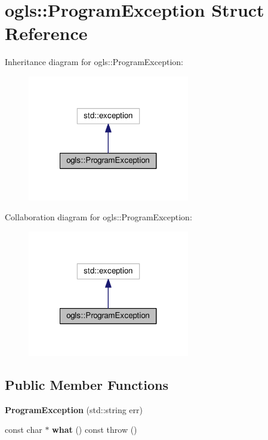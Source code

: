 \hypertarget{structogls_1_1ProgramException}{\section{ogls\-:\-:Program\-Exception Struct Reference}
\label{structogls_1_1ProgramException}
}


Inheritance diagram for ogls\-:\-:Program\-Exception\-:
\nopagebreak
\begin{figure}[H]
\begin{center}
\leavevmode
\includegraphics[width=200pt]{d2/d5f/structogls_1_1ProgramException__inherit__graph}
\end{center}
\end{figure}


Collaboration diagram for ogls\-:\-:Program\-Exception\-:
\nopagebreak
\begin{figure}[H]
\begin{center}
\leavevmode
\includegraphics[width=200pt]{d2/d29/structogls_1_1ProgramException__coll__graph}
\end{center}
\end{figure}
\subsection*{Public Member Functions}
\begin{DoxyCompactItemize}
\item 
\hypertarget{structogls_1_1ProgramException_afeaffb31d0feabdc28590e18dbdd13e2}{{\bfseries Program\-Exception} (std\-::string err)}\label{structogls_1_1ProgramException_afeaffb31d0feabdc28590e18dbdd13e2}

\item 
\hypertarget{structogls_1_1ProgramException_a82c7b3e7ba0ba7d7ff5a496741438556}{const char $\ast$ {\bfseries what} () const   throw ()}\label{structogls_1_1ProgramException_a82c7b3e7ba0ba7d7ff5a496741438556}

\end{DoxyCompactItemize}
